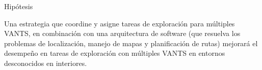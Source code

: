 \documentclass[
  24pt, %
  aspectratio=169, %
]{beamer}
\begin{document}
\begin{frame}{Hipótesis}

  Una estrategia que coordine y asigne tareas de exploración para múltiples VANTS, en combinación con una arquitectura de software (que resuelva los problemas de localización, manejo de mapas y planificación de rutas) mejorará el desempeño en tareas de exploración con múltiples VANTS en entornos desconocidos en interiores.
  
  
  
\end{frame}
\end{document}
